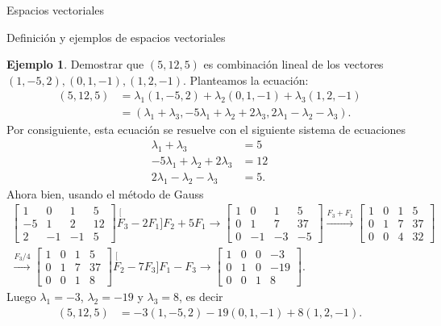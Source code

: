 \documentclass[a4paper,12pt,twoside,spanish,reqno]{amsbook}
\theoremstyle{definition}
\newtheorem{ejemplo}{Ejemplo}[section]
\theoremstyle{remark}
\begin{document}
\begin{chapter}{Espacios vectoriales}
\begin{section}{Definición y ejemplos de espacios vectoriales}
		
		\begin{ejemplo} Demostrar que $(5,12,5)$  es combinación lineal de los vectores $(1,-5,2), (0,1,-1), (1,2,-1)$. Planteamos la ecuación:
			\begin{align*}
				(5,12,5) &= \lambda_1(1,-5,2)+\lambda_2 (0,1,-1)+\lambda_3 (1,2,-1) 
				\\&= (\lambda_1+\lambda_3,-5\lambda_1+\lambda_2+2\lambda_3,2\lambda_1-\lambda_2-\lambda_3).
			\end{align*}
			Por consiguiente,  esta ecuación se resuelve con el siguiente sistema de ecuaciones
			\begin{align*}
				\lambda_1+\lambda_3 &= 5 \\
				-5\lambda_1+\lambda_2+2\lambda_3 &= 12 \\
				2\lambda_1-\lambda_2-\lambda_3 &= 5.
			\end{align*}
			Ahora bien, usando el método de Gauss
								\begin{multline*}
			\left[\begin{array}{rrr|r}1 & 0 & 1 &  5 \\ -5 & 1 & 2 &  12 \\	2 & -1 & -1 &  5  \end{array}\right]
			\stackrel[F_3 -2F_1]{F_2 + 5F_1}{\longrightarrow} 
			\left[\begin{array}{rrr|r}1 & 0 & 1 &  5 \\ 0 & 1 & 7 &  37 \\	0 & -1 & -3 &  -5  \end{array}\right]
			\stackrel{F_3+F_1}{\longrightarrow} 
			\left[\begin{array}{rrr|r}1 & 0 & 1 &  5 \\ 0 & 1 & 7 &  37 \\	0 & 0 & 4 & 32  \end{array}\right]
			\\
			\stackrel{F_3/4}{\longrightarrow} 
			\left[\begin{array}{rrr|r}1 & 0 & 1 & 5 \\ 0 & 1 & 7 & 37 \\	0 & 0 & 1& 8  \end{array}\right]
			\stackrel[F_2 -7F_3]{F_1 - F_3}{\longrightarrow}
			\left[\begin{array}{rrr|r}1 & 0 & 0 & -3 \\ 0 & 1 & 0 &  -19 \\	0 & 0 & 1& 8  \end{array}\right].
			\end{multline*}	
			Luego $\lambda_1= -3$, $\lambda_2 = -19$ y $\lambda_3=8$,  es decir
			\begin{align*}
			(5,12,5) &= -3(1,-5,2)-19 (0,1,-1)+8 (1,2,-1).
			\end{align*}
		\end{ejemplo}
\end{section}
	

\end{chapter}
\end{document}
